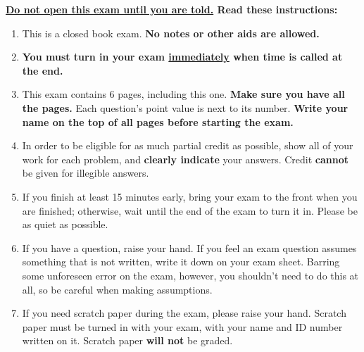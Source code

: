 \documentclass[11pt]{article}
\begin{document}

  \noindent
  {\large\textbf{\underline{Do not open this exam until you are told.}  Read
  these instructions:}}

  \vspace{-2mm}

  \thispagestyle{myheadings}

  \begin{enumerate}

    \addtolength{\itemsep}{-2mm}  %

    \item This is a closed book exam.  \textbf{No
          notes %
          or other aids are allowed.}

    \item {\bf You must turn in your exam \underline{immediately} when time is
          called at the end.}

    \item This exam contains 6 pages, including this one.  \textbf{Make sure
          you have all the pages.}  Each question's point value is next to
          its number.  \textbf{Write your name on the top of all pages before
          starting the exam.}

    \item In order to be eligible for as much partial credit as possible,
          show all of your work for each problem, and \textbf{clearly
          indicate} your answers.  Credit \textbf{cannot} be given for
          illegible answers.

    \item If you finish at least 15 minutes early, bring your exam to the
          front when you are finished; otherwise, wait until the end of the
          exam to turn it in. Please be as quiet as possible.

    \item If you have a question, raise your hand.  If you feel an exam
          question assumes something that is not written, write it down on
          your exam sheet.  Barring some unforeseen error on the exam,
          however, you shouldn't need to do this at all, so be careful when
          making assumptions.

    \item If you need scratch paper during the exam, please raise your hand.
          Scratch paper must be turned in with your exam, with your name and
          ID number written on it.  Scratch paper \textbf{will not} be
          graded.


\end{enumerate}
\end{document}
